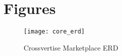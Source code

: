 \chapter{Figures}

\begin{figure}
\centering
\texttt{[image: core\_erd]}
\caption{Crossvertise Marketplace ERD}
\label{fig:xv_erd}
\end{figure}